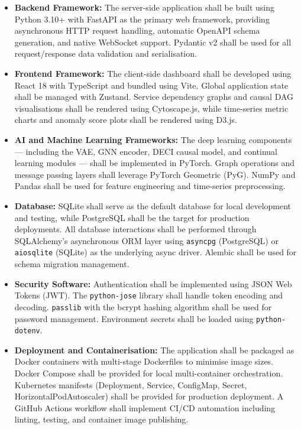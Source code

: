 \begin{itemize}

    \item \textbf{Backend Framework:} The server-side application shall be built using Python 3.10+ with FastAPI as the primary web framework, providing asynchronous HTTP request handling, automatic OpenAPI schema generation, and native WebSocket support. Pydantic v2 shall be used for all request/response data validation and serialisation.

    \item \textbf{Frontend Framework:} The client-side dashboard shall be developed using React 18 with TypeScript and bundled using Vite. Global application state shall be managed with Zustand. Service dependency graphs and causal DAG visualisations shall be rendered using Cytoscape.js, while time-series metric charts and anomaly score plots shall be rendered using D3.js.

    \item \textbf{AI and Machine Learning Frameworks:} The deep learning components — including the VAE, GNN encoder, DECI causal model, and continual learning modules — shall be implemented in PyTorch. Graph operations and message passing layers shall leverage PyTorch Geometric (PyG). NumPy and Pandas shall be used for feature engineering and time-series preprocessing.

    \item \textbf{Database:} SQLite shall serve as the default database for local development and testing, while PostgreSQL shall be the target for production deployments. All database interactions shall be performed through SQLAlchemy's asynchronous ORM layer using \texttt{asyncpg} (PostgreSQL) or \texttt{aiosqlite} (SQLite) as the underlying async driver. Alembic shall be used for schema migration management.

    \item \textbf{Security Software:} Authentication shall be implemented using JSON Web Tokens (JWT). The \texttt{python-jose} library shall handle token encoding and decoding. \texttt{passlib} with the bcrypt hashing algorithm shall be used for password management. Environment secrets shall be loaded using \texttt{python-dotenv}.

    \item \textbf{Deployment and Containerisation:} The application shall be packaged as Docker containers with multi-stage Dockerfiles to minimise image sizes. Docker Compose shall be provided for local multi-container orchestration. Kubernetes manifests (Deployment, Service, ConfigMap, Secret, HorizontalPodAutoscaler) shall be provided for production deployment. A GitHub Actions workflow shall implement CI/CD automation including linting, testing, and container image publishing.


\end{itemize}
